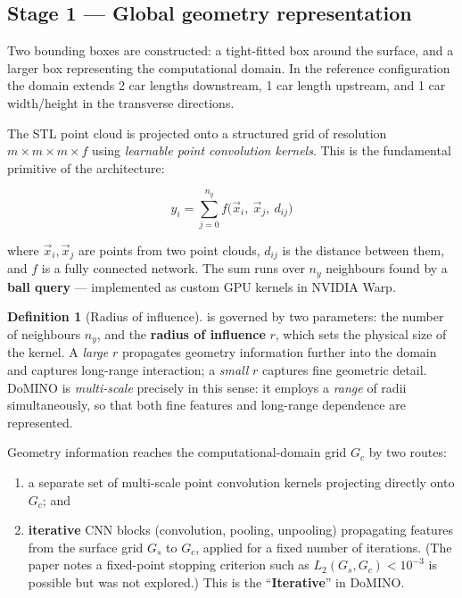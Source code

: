 \documentclass[10pt,a4paper]{article}
\theoremstyle{definition}
\newtheorem{definition}{Definition}[section]
\begin{document}
\subsection{Stage 1 --- Global geometry representation}

Two bounding boxes are constructed: a tight-fitted box around the surface, and a
larger box representing the computational domain. In the reference configuration the
domain extends 2 car lengths downstream, 1 car length upstream, and 1 car
width/height in the transverse directions.

The STL point cloud is projected onto a structured grid of resolution
$m\times m\times m\times f$ using \emph{learnable point convolution kernels}. This is
the fundamental primitive of the architecture:

\begin{equation}
\boxed{\;
y_i = \sum_{j=0}^{n_y} f\bigl(\vec{x}_i,\ \vec{x}_j,\ d_{ij}\bigr)
\;}
\label{eq:pointconv}
\end{equation}

where $\vec{x}_i, \vec{x}_j$ are points from two point clouds, $d_{ij}$ is the
distance between them, and $f$ is a fully connected network. The sum runs over $n_y$
neighbours found by a \textbf{ball query} --- implemented as custom GPU kernels in
NVIDIA Warp.

\begin{definition}[Radius of influence]
\label{def:radius}
 is governed by two parameters: the number of neighbours $n_y$,
and the \textbf{radius of influence} $r$, which sets the physical size of the kernel.
A \emph{large} $r$ propagates geometry information further into the domain and
captures long-range interaction; a \emph{small} $r$ captures fine geometric detail.
DoMINO is \emph{multi-scale} precisely in this sense: it employs a \emph{range} of
radii simultaneously, so that both fine features and long-range dependence are
represented.
\end{definition}

Geometry information reaches the computational-domain grid $G_c$ by two routes:
\begin{enumerate}[label=(\roman*)]
  \item a separate set of multi-scale point convolution kernels projecting directly
  onto $G_c$; and
  \item \textbf{iterative} CNN blocks (convolution, pooling, unpooling) propagating
  features from the surface grid $G_s$ to $G_c$, applied for a fixed number of
  iterations. (The paper notes a fixed-point stopping criterion such as
  $L_2(G_s, G_c) < 10^{-3}$ is possible but was not explored.) This is the
  ``\textbf{Iterative}'' in DoMINO.
\end{enumerate}
\end{document}
